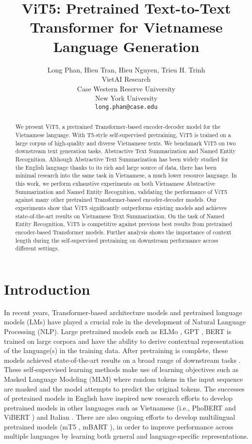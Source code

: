 \documentclass[11pt,a4paper]{article}
\title{ViT5: Pretrained Text-to-Text Transformer for Vietnamese Language Generation}
\author{Long Phan, Hieu Tran, Hieu Nguyen, Trieu H. Trinh \\
        VietAI Research \\  Case Western Reserve University \\
        New York University \\
        \texttt{long.phan@case.edu}}
\date{}
\begin{document}
\maketitle
\begin{abstract}




We present ViT5, a pretrained Transformer-based encoder-decoder model for the Vietnamese language. 
With T5-style self-supervised pretraining, ViT5 is trained on a large corpus of high-quality and diverse Vietnamese texts. We benchmark ViT5 on two downstream text generation tasks, Abstractive Text Summarization and Named Entity Recognition. Although Abstractive Text Summarization has been widely studied for the English language thanks to its rich and large source of data, there has been minimal research into the same task in Vietnamese, a much lower resource language. In this work, we perform exhaustive experiments on both Vietnamese Abstractive Summarization and Named Entity Recognition, validating the performance of ViT5 against many other pretrained Transformer-based encoder-decoder models. Our experiments show that ViT5 significantly outperforms existing models and achieves state-of-the-art results on Vietnamese Text Summarization. On the task of Named Entity Recognition, ViT5 is competitive against previous best results from pretrained encoder-based Transformer models. Further analysis shows the importance of context length during the self-supervised pretraining on downstream performance across different settings. \end{abstract}

\section{Introduction}
In recent years, Transformer-based architecture models and pretrained language models (LMs) have played a crucial role in the development of Natural Language Processing (NLP). Large pretrained models such as ELMo \cite{elmo}, GPT \cite{GPT}, BERT \cite{bert} is trained on large corpora and have the ability to derive contextual representation of the language(s) in the training data. After pretraining is complete, these models achieved state-of-the-art results on a broad range of downstream tasks \cite{bert}. These self-supervised learning methods make use of learning objectives such as Masked Language Modeling (MLM) \cite{bert} where random tokens in the input sequence are masked and the model attempts to predict the original tokens. The successes of pretrained models in English have inspired new research efforts to develop pretrained models in other languages such as Vietnamese (i.e., PhoBERT \cite{phobert} and ViBERT \cite{vibert}) and Italian \cite{it5}. There are also ongoing efforts to develop multilingual pretrained models (mT5 \cite{mT5}, mBART \cite{mbart}), in order to improve performance across multiple languages by learning both general and language-specific representations.
\end{document}
